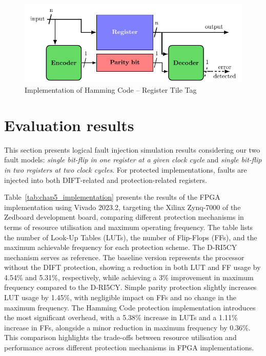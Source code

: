 \begin{figure}[ht]
    \centering
    \includegraphics[page=3, width=\textwidth]{c5_countermeasures_dift/img/archi_contremesures.pdf}
    \caption{Implementation of Hamming Code -- Register Tile Tag}
    \label{fig:implementation_hc_2}
\end{figure}

\section{Evaluation results}

This section presents logical fault injection simulation results considering our two fault models: \textit{single bit-flip in one register at a given clock cycle} and \textit{single bit-flip in two registers at two clock cycles}. For protected implementations, faults are injected into both DIFT-related and protection-related registers.

Table~\ref{tab:chap5_implementation} presents the results of the FPGA implementation using Vivado 2023.2, targeting the Xilinx Zynq-7000 of the Zedboard development board, comparing different protection mechanisms in terms of resource utilisation and maximum operating frequency. The table lists the number of Look-Up Tables (LUTs), the number of Flip-Flops (FFs), and the maximum achievable frequency for each protection scheme. The D-RI5CY mechanism serves as reference. The baseline version represents the processor without the DIFT protection, showing a reduction in both LUT and FF usage by 4.54\% and 5.31\%, respectively, while achieving a 3\% improvement in maximum frequency compared to the D-RI5CY.
Simple parity protection slightly increases LUT usage by 1.45\%, with negligible impact on FFs and no change in the maximum frequency. The Hamming Code protection implementation introduces the most significant overhead, with a 5.38\% increase in LUTs and a 1.11\% increase in FFs, alongside a minor reduction in maximum frequency by 0.36\%.
This comparison highlights the trade-offs between resource utilisation and performance across different protection mechanisms in FPGA implementations.

